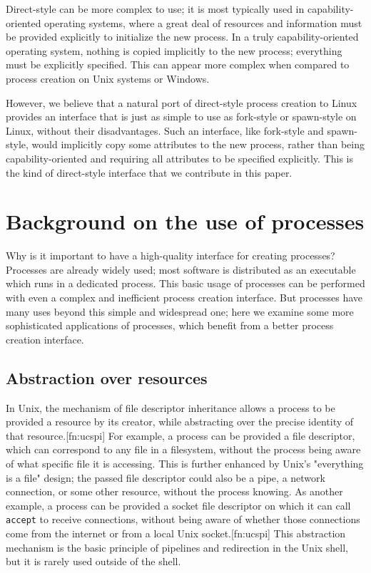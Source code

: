 \documentclass{acmart}
\begin{document}
Direct-style can be more complex to use;
it is most typically used in capability-oriented operating systems,
where a great deal of resources and information must be provided explicitly to initialize the new process.
In a truly capability-oriented operating system,
nothing is copied implicitly to the new process;
everything must be explicitly specified.
This can appear more complex
when compared to process creation on Unix systems or Windows.

However, we believe that a natural port of direct-style process creation to Linux
provides an interface that is just as simple to use as fork-style or spawn-style on Linux,
without their disadvantages.
Such an interface, like fork-style and spawn-style,
would implicitly copy some attributes to the new process,
rather than being capability-oriented and requiring all attributes to be specified explicitly.
This is the kind of direct-style interface that we contribute in this paper.

\section{Background on the use of processes}
Why is it important to have a high-quality interface for creating processes?
Processes are already widely used;
most software is distributed as an executable which runs in a dedicated process.
This basic usage of processes can be performed with even a complex and inefficient process creation interface.
But processes have many uses beyond this simple and widespread one;
here we examine some more sophisticated applications of processes,
which benefit from a better process creation interface.
\subsection{Abstraction over resources}
In Unix, the mechanism of file descriptor inheritance
allows a process to be provided a resource by its creator,
while abstracting over the precise identity of that resource.[fn:ucspi]
For example, a process can be provided a file descriptor,
which can correspond to any file in a filesystem,
without the process being aware of what specific file it is accessing.
This is further enhanced by Unix's "everything is a file" design;
the passed file descriptor could also be a pipe, a network connection, or some other resource,
without the process knowing.
As another example,
a process can be provided a socket file descriptor on which it can call \texttt{accept} to receive connections,
without being aware of whether those connections come from the internet or from a local Unix socket.[fn:ucspi]
This abstraction mechanism is the basic principle of pipelines and redirection in the Unix shell,
but it is rarely used outside of the shell.
\end{document}
